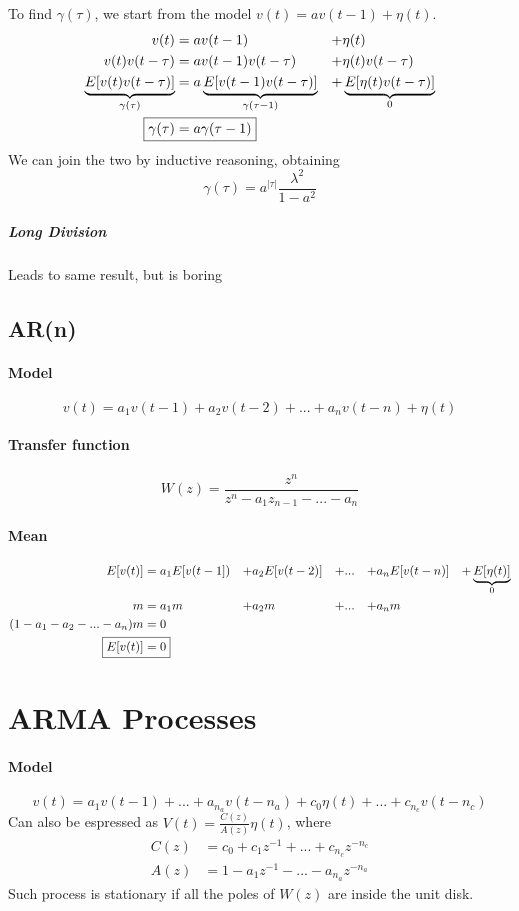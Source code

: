 \documentclass{article}
\begin{document}
To find $\gamma(\tau)$, we start from the model $v(t)=av(t-1)+\eta(t)$.
\begin{alignat*}{4}
v(t)&=av(t-1)&+&\eta(t)\\
v(t)v(t-\tau)&=av(t-1)v(t-\tau)&+&\eta(t)v(t-\tau)\\
\underbrace{E[v(t)v(t-\tau)]}_{\gamma(\tau)}&=
	a\underbrace{E[v(t-1)v(t-\tau)]}_{\gamma(\tau-1)}&+&
	\underbrace{E[\eta(t)v(t-\tau)]}_0\\
\Aboxed{
\gamma(\tau)&=a\gamma(\tau-1)
}
\end{alignat*}
We can join the two by inductive reasoning, obtaining
\[\boxed{
\gamma(\tau)=a^{|\tau|}\frac{\lambda^2}{1-a^2}
}\]
\subparagraph{Long Division} Leads to same result, but is boring

\subsection{AR(n)}
\paragraph{Model}
\[
v(t)=a_1v(t-1)+a_2v(t-2)+...+a_nv(t-n)+\eta(t)
\]
\paragraph{Transfer function}
\[
W(z)=\frac{z^n}{z^n-a_1z_{n-1}-...-a_n}
\]
\paragraph{Mean}
\begin{alignat*}{6}
E[v(t)]	&=	a_1E[v(t-1])	&+&a_2E[v(t-2)]	&+&...	&+&a_nE[v(t-n)]	&+&\underbrace{E[\eta(t)]}_0\\
m		&=	a_1m			&+&a_2m			&+&...	&+&a_nm\\
(1-a_1-a_2-...-a_n)m&=0\\
\Aboxed{
E[v(t)]&=0
}
\end{alignat*}
\section{ARMA Processes}
\paragraph{Model}
\[
v(t)=
	a_1v(t-1)+...+a_{n_a}v(t-n_a)+
	c_0\eta(t)+...+c_{n_c}v(t-n_c)
\]
Can also be espressed as $V(t)=\frac{C(z)}{A(z)}\eta(t)$, where
\begin{align*}
C(z)&=c_0+c_1z^{-1}+...+c_{n_c}z^{-n_c}\\
A(z)&=1-a_1z^{-1}-...-a_{n_a}z^{-n_a}
\end{align*}
Such process is stationary if all the poles of $W(z)$ are inside the unit disk.
\end{document}
